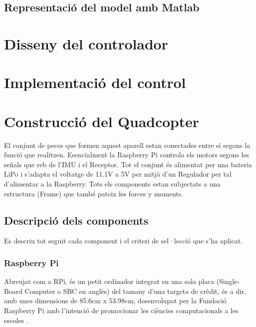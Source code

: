 \documentclass[twoside]{article}
\begin{document}
\subsection{Representació del model amb Matlab}





\newpage
\section{Disseny del controlador}
\newpage
\section{Implementació del control} 

\newpage
\section{Construcció del Quadcopter}
El conjunt de peces que formen aquest aparell estan conectades entre sí segons la funció que realitzen. Esencialment la Raspberry Pi controla els motors segons les señals que reb de l'IMU i el Receptor. Tot el conjunt és alimentat per una bateria LiPo i s'adapta el voltatge de 11.1V a 5V per mitjà d'un Regulador per tal d'alimentar a la Raspberry. Tots els components estan subjectats a una estructura (Frame) que també pateix les forces y moments.  

\subsection{Descripció dels components}
Es descriu tot seguit cada component i el criteri de sel·lecció que s'ha aplicat.
\subsubsection*{Raspberry Pi} 
Abreujat com a RPi, és un petit ordinador integrat en una sola placa (Single-Board Computer o SBC en anglès) del tamany d'una targeta de crèdit, és a dir, amb unes dimensions de 85.6cm x 53.98cm, desenvolupat per la Fundació Raspberry Pi amb l'intenció de promocionar les ciències computacionals a les escoles \cite{RPiWiki}. 
\end{document}
